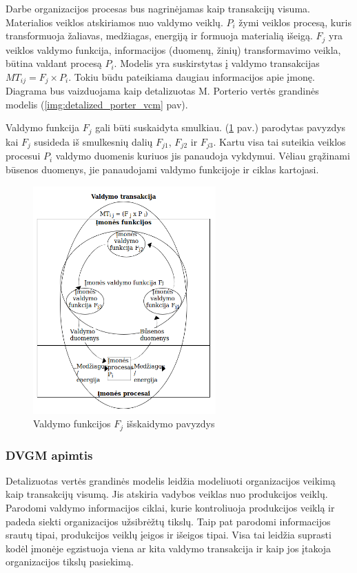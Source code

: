 Darbe organizacijos procesas bus nagrinėjamas kaip transakcijų visuma. Materialios
veiklos atskiriamos nuo valdymo veiklų. $P_i$ žymi veiklos procesą, kuris
transformuoja žaliavas, medžiagas, energiją ir formuoja materialią išeigą.
$F_j$ yra veiklos valdymo funkcija, informacijos (duomenų, žinių) transformavimo
veikla, būtina valdant procesą $P_i$. Modelis yra suskirstytas į valdymo
transakcijas $ MT_{ij} = F_j \times P_i$. Tokiu būdu pateikiama daugiau
informacijos apie įmonę. Diagrama bus vaizduojama kaip detalizuotas M.
Porterio vertės grandinės modelis (\ref{img:detalized_porter_vcm} pav).

Valdymo funkcija $F_j$ gali būti suskaidyta smulkiau.
(\ref{img:splitted_management_function} pav.) parodytas pavyzdys kai $F_j$
susideda iš smulkesnių dalių $F_{j1}$, $F_{j2}$ ir $F_{j3}$. Kartu visa tai
suteikia veiklos procesui $P_i$ valdymo duomenis kuriuos jis panaudoja vykdymui.
Vėliau grąžinami būsenos duomenys, jie panaudojami valdymo funkcijoje ir ciklas
kartojasi.

\begin{figure}[H]
	\centering
	\includegraphics[width=7cm]{img/splitted_management_function}
	\caption{Valdymo funkcijos $F_j$ išskaidymo pavyzdys}
	\label{img:splitted_management_function}
\end{figure}


\subsubsection{DVGM apimtis}

Detalizuotas vertės grandinės modelis leidžia modeliuoti organizacijos veikimą kaip
transakcijų visumą. Jis atskiria vadybos veiklas nuo produkcijos veiklų.
Parodomi valdymo informacijos ciklai, kurie kontroliuoja produkcijos veiklą ir
padeda siekti organizacijos užsibrėžtų tikslų. Taip pat parodomi informacijos srautų
tipai, produkcijos veiklų įeigos ir išeigos tipai. Visa tai leidžia suprasti
kodėl įmonėje egzistuoja viena ar kita valdymo transakcija ir kaip jos įtakoja
organizacijos tikslų pasiekimą.

